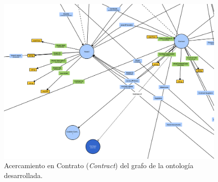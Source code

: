         \begin{figure}[ht!]
            \includegraphics[width=150mm]{figuras/zoomContract.png}
            \caption{Acercamiento en Contrato (\textit{Contract}) del grafo de la ontología desarrollada.}
            \label{img:zoomContract}
            \end{figure}